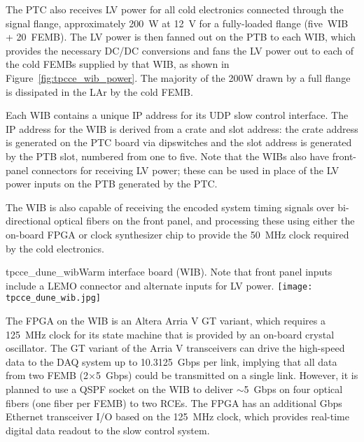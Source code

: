 The PTC also receives LV power for all cold
electronics connected through the signal flange, approximately 200~W at 12~V for a
fully-loaded flange (five~WIB + 20~FEMB). The LV power is then fanned out
on the PTB to each WIB, which provides the necessary DC/DC conversions and fans
the LV power out to each of the cold FEMBs supplied by that WIB, 
as shown in Figure~\ref{fig:tpcce_wib_power}. The 
majority of the 200W drawn by a full flange is dissipated in the LAr
by the cold FEMB.



Each WIB contains a 
unique IP address for its UDP slow control interface. The IP address for the WIB is 
derived from a crate and slot address: the crate address is generated on the PTC 
board via dipswitches and the slot address is generated by the PTB slot, numbered 
from one to five. Note that the WIBs also have front-panel
connectors for receiving LV power; these can be used in place of 
the LV power inputs on the PTB generated by the PTC.

The WIB is also capable of
receiving the encoded system timing signals over bi-directional optical
fibers on the front panel, and processing these using either
the on-board FPGA or clock synthesizer chip to provide the 50~MHz
clock required by the cold electronics.  

\begin{cdrfigure}{tpcce_dune_wib}{Warm interface board (WIB). Note 
that front panel inputs include a LEMO connector and alternate inputs for LV power.}
\texttt{[image: tpcce\_dune\_wib.jpg]}
\end{cdrfigure}

The FPGA on the WIB is an Altera Arria V GT variant, which requires a
125~MHz clock for its state machine that is provided by an on-board crystal
oscillator. The GT variant of the Arria V
transceivers can drive the high-speed data to the DAQ system up to
10.3125~Gbps per link,  implying that all data from
two FEMB (2$\times$5~Gbps) could be transmitted on a single link. However, it is planned to
use a QSPF socket on the WIB to deliver $\sim$5~Gbps on four optical fibers 
(one fiber per FEMB) to two RCEs.  The FPGA has an additional Gbps Ethernet
transceiver I/O based on the 125~MHz clock, which provides real-time digital data readout to the slow control system.



